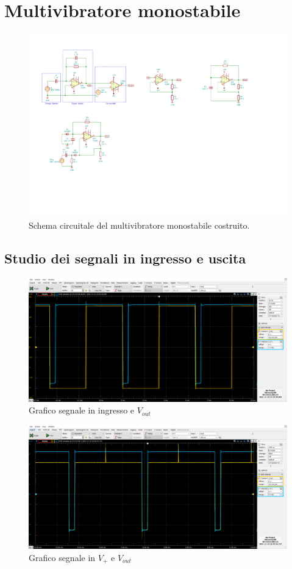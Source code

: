 \documentclass[10pt, a4paper, italian]{article}
\begin{document}
\section{Multivibratore monostabile}
\begin{figure}[htbp]
    \centering
	\includegraphics[scale=1.2]{monostable}
    \caption{Schema circuitale del multivibratore monostabile costruito.
    \label{fig: monostableschm}}
\end{figure}

\subsection{Studio dei segnali in ingresso e uscita}
\begin{figure}[htbp]
\centering
\includegraphics[scale=0.42]{monostabile}
\caption{Grafico segnale in ingresso e $V_{out}$ \label{fig: vout_mstabile}}
\end{figure}

\begin{figure}[htbp]
\centering
\includegraphics[scale=0.42]{monostabileV+}
\caption{Grafico segnale in $V_+$ e $V_{out}$}
\end{figure}
\end{document}
